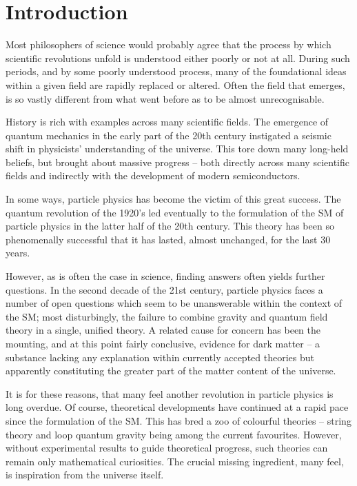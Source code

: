 \chapter*{Introduction}

Most philosophers of science would probably agree that the process by which
scientific revolutions unfold is understood either poorly or not at all. During
such periods, and by some poorly understood process, many of the foundational
ideas within a given field are rapidly replaced or altered. Often the field that
emerges, is so vastly different from what went before as to be almost
unrecognisable.

History is rich with examples across many scientific fields. The emergence of
quantum mechanics in the early part of the 20th century instigated a seismic
shift in physicists' understanding of the universe. This tore down many
long-held beliefs, but brought about massive progress -- both directly across
many scientific fields and indirectly with the development of modern
semiconductors.

In some ways, particle physics has become the victim of this great success. The
quantum revolution of the 1920's led eventually to the formulation of the
\acl{SM} of particle physics in the latter half of the 20th century. This theory
has been so phenomenally successful that it has lasted, almost unchanged, for
the last 30 years.

However, as is often the case in science, finding answers often yields further
questions. In the second decade of the 21st century, particle physics faces a
number of open questions which seem to be unanswerable within the context of the
\ac{SM}; most disturbingly, the failure to combine gravity and quantum field
theory in a single, unified theory. A related cause for concern has been the
mounting, and at this point fairly conclusive, evidence for dark matter -- a
substance lacking any explanation within currently accepted theories but
apparently constituting the greater part of the matter content of the universe.

It is for these reasons, that many feel another revolution in particle physics
is long overdue. Of course, theoretical developments have continued at a rapid
pace since the formulation of the \ac{SM}. This has bred a zoo of colourful
theories -- string theory and loop quantum gravity being among the current
favourites. However, without experimental results to guide theoretical progress,
such theories can remain only mathematical curiosities. The crucial missing
ingredient, many feel, is inspiration from the universe itself.

